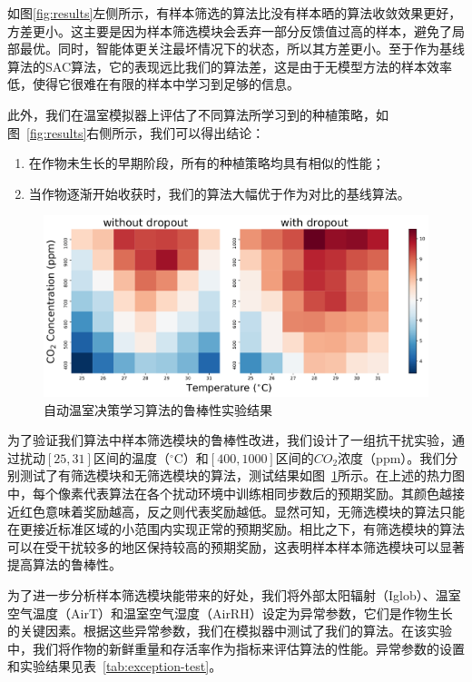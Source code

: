 如图\ref{fig:results}左侧所示，有样本筛选的算法比没有样本晒的算法收敛效果更好，方差更小。这主要是因为样本筛选模块会丢弃一部分反馈值过高的样本，避免了局部最优。同时，智能体更关注最坏情况下的状态，所以其方差更小。至于作为基线算法的SAC算法，它的表现远比我们的算法差，这是由于无模型方法的样本效率低，使得它很难在有限的样本中学习到足够的信息。

此外，我们在温室模拟器上评估了不同算法所学习到的种植策略，如图~\ref{fig:results}右侧所示，我们可以得出结论：

\begin{enumerate}
    \item 在作物未生长的早期阶段，所有的种植策略均具有相似的性能；
    \item 当作物逐渐开始收获时，我们的算法大幅优于作为对比的基线算法。
\end{enumerate}


\begin{figure}
\centering
\includegraphics[width=\textwidth]{figures/robustness-heatmap-for-iros.pdf}
\caption{自动温室决策学习算法的鲁棒性实验结果}
\label{fig:robustness}
\end{figure}

为了验证我们算法中样本筛选模块的鲁棒性改进，我们设计了一组抗干扰实验，通过扰动$[25, 31]$区间的温度（$^\circ$C）和$[400, 1000]$区间的$CO_2$浓度（ppm）。我们分别测试了有筛选模块和无筛选模块的算法，测试结果如图~\ref{fig:robustness}所示。在上述的热力图中，每个像素代表算法在各个扰动环境中训练相同步数后的预期奖励。其颜色越接近红色意味着奖励越高，反之则代表奖励越低。显然可知，无筛选模块的算法只能在更接近标准区域的小范围内实现正常的预期奖励。相比之下，有筛选模块的算法可以在受干扰较多的地区保持较高的预期奖励，这表明样本样本筛选模块可以显著提高算法的鲁棒性。

为了进一步分析样本筛选模块能带来的好处，我们将外部太阳辐射（Iglob）、温室空气温度（AirT）和温室空气湿度（AirRH）设定为异常参数，它们是作物生长的关键因素。根据这些异常参数，我们在模拟器中测试了我们的算法。在该实验中，我们将作物的新鲜重量和存活率作为指标来评估算法的性能。异常参数的设置和实验结果见表~\ref{tab:exception-test}。

